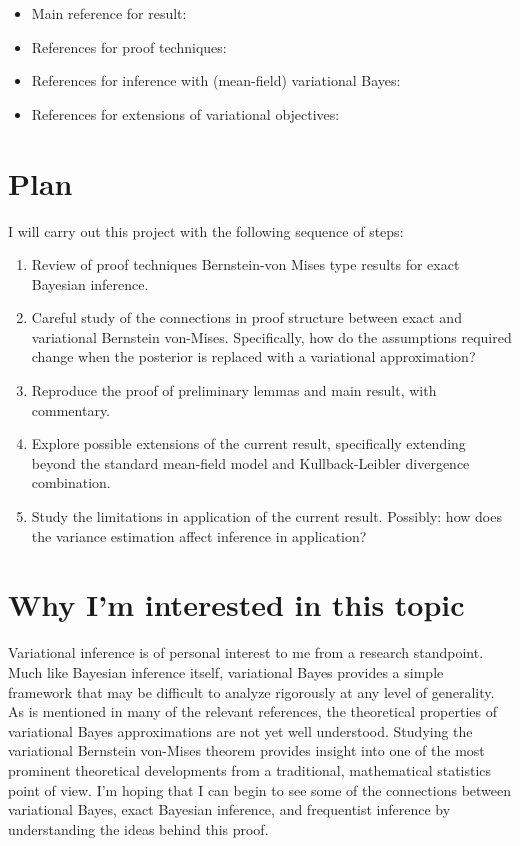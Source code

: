 \documentclass[]{STAT_547C}
\begin{document}
\begin{itemize}
  \item Main reference for result: \cite{Wang:2019:VBVM}
  \item References for proof techniques: \cite{Asymptotics:2000} \cite{kleijn2012} \cite{Lu:2017}
  \item References for inference with (mean-field) variational Bayes: \cite{GiordanoJMLR}
  \item References for extensions of variational objectives: \cite{f2020} \cite{renyi2016} 
\end{itemize}


\section{Plan}

I will carry out this project with the following sequence of steps: 
\begin{enumerate}
  \item Review of proof techniques Bernstein-von Mises type results for exact Bayesian inference. 
  \item Careful study of the connections in proof structure between exact and variational Bernstein von-Mises. Specifically, how do the assumptions required change when the posterior is replaced with a variational approximation?
  \item Reproduce the proof of preliminary lemmas and main result, with commentary.
  \item Explore possible extensions of the current result, specifically extending beyond the standard mean-field model and Kullback-Leibler divergence combination. 
  \item Study the limitations in application of the current result. Possibly: how does the variance estimation affect inference in application?

\end{enumerate}


\section{Why I'm interested in this topic}

Variational inference is of personal interest to me from a research standpoint. Much like Bayesian inference itself, variational Bayes provides a simple framework that may be difficult to analyze rigorously at any level of generality. As is mentioned in many of the relevant references, the theoretical properties of variational Bayes approximations are not yet well understood. Studying the variational Bernstein von-Mises theorem provides insight into one of the most prominent theoretical developments from a traditional, mathematical statistics point of view. I'm hoping that I can begin to see some of the connections between variational Bayes, exact Bayesian inference, and frequentist inference by understanding the ideas behind this proof. 

\printbibliography
\end{document}
